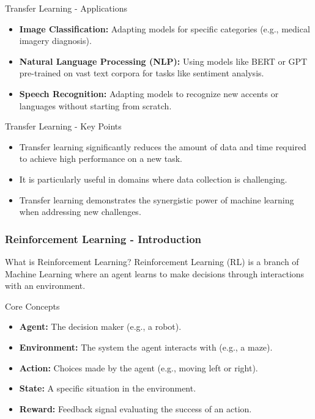 \documentclass[aspectratio=169]{beamer}
\begin{document}
\begin{frame}[fragile]{Transfer Learning - Applications}
    \begin{itemize}
        \item \textbf{Image Classification:} Adapting models for specific categories (e.g., medical imagery diagnosis).
        \item \textbf{Natural Language Processing (NLP):} Using models like BERT or GPT pre-trained on vast text corpora for tasks like sentiment analysis.
        \item \textbf{Speech Recognition:} Adapting models to recognize new accents or languages without starting from scratch.
    \end{itemize}
\end{frame}

\begin{frame}[fragile]{Transfer Learning - Key Points}
    \begin{itemize}
        \item Transfer learning significantly reduces the amount of data and time required to achieve high performance on a new task.
        \item It is particularly useful in domains where data collection is challenging.
        \item Transfer learning demonstrates the synergistic power of machine learning when addressing new challenges.
    \end{itemize}
\end{frame}

\begin{frame}[fragile]
    \frametitle{Reinforcement Learning - Introduction}
    \begin{block}{What is Reinforcement Learning?}
        Reinforcement Learning (RL) is a branch of Machine Learning where an agent learns to make decisions through interactions with an environment. 
    \end{block}

    \begin{block}{Core Concepts}
        \begin{itemize}
            \item \textbf{Agent:} The decision maker (e.g., a robot).
            \item \textbf{Environment:} The system the agent interacts with (e.g., a maze).
            \item \textbf{Action:} Choices made by the agent (e.g., moving left or right).
            \item \textbf{State:} A specific situation in the environment.
            \item \textbf{Reward:} Feedback signal evaluating the success of an action.
        \end{itemize}
    \end{block}
\end{frame}
\end{document}
